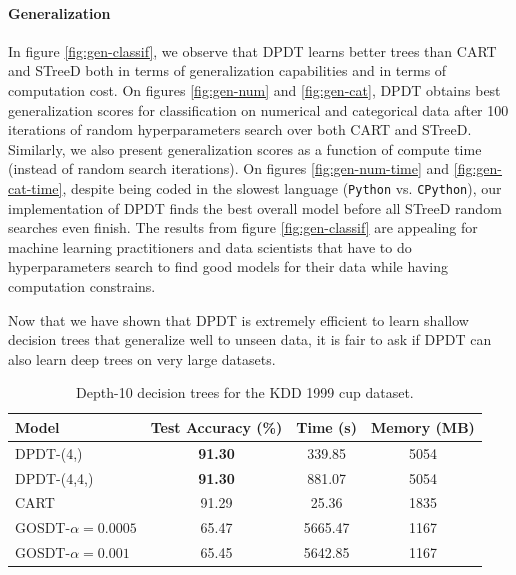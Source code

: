 \paragraph{Generalization} In figure \ref{fig:gen-classif}, we observe that DPDT learns better trees than CART and STreeD both in terms of generalization capabilities and in terms of computation cost. On figures \ref{fig:gen-num} and \ref{fig:gen-cat}, DPDT obtains best generalization scores for classification on numerical and categorical data after 100 iterations of random hyperparameters search over both CART and STreeD. Similarly, we also present generalization scores as a function of compute time (instead of random search iterations). On figures \ref{fig:gen-num-time} and \ref{fig:gen-cat-time}, despite being coded in the slowest language (\texttt{Python} vs. \texttt{CPython}), our implementation of DPDT finds the best overall model before all STreeD random searches even finish.
The results from figure \ref{fig:gen-classif} are appealing for machine learning practitioners and data scientists that have to do hyperparameters search to find good models for their data while having computation constrains.

Now that we have shown that DPDT is extremely efficient to learn shallow decision trees that generalize well to unseen data, it is fair to ask if DPDT can also learn deep trees on very large datasets.

\begin{table}
\centering
\caption{Depth-10 decision trees for the KDD 1999 cup dataset.}
\label{tab:model-comparison}
\small
\begin{tabular}{lccc}
\hline
\textbf{Model} & \textbf{Test Accuracy (\%)} & \textbf{Time (s)} & \textbf{Memory (MB)} \\
\hline
DPDT-(4,) & \textbf{91.30} & 339.85 & 5054 \\
DPDT-(4,4,) & \textbf{91.30} & 881.07 & 5054 \\
CART & 91.29 & 25.36 & 1835 \\
GOSDT-$\alpha=0.0005$& 65.47 & 5665.47 & 1167 \\
GOSDT-$\alpha=0.001$ & 65.45 & 5642.85 & 1167 \\
\hline
\end{tabular}
\end{table}

